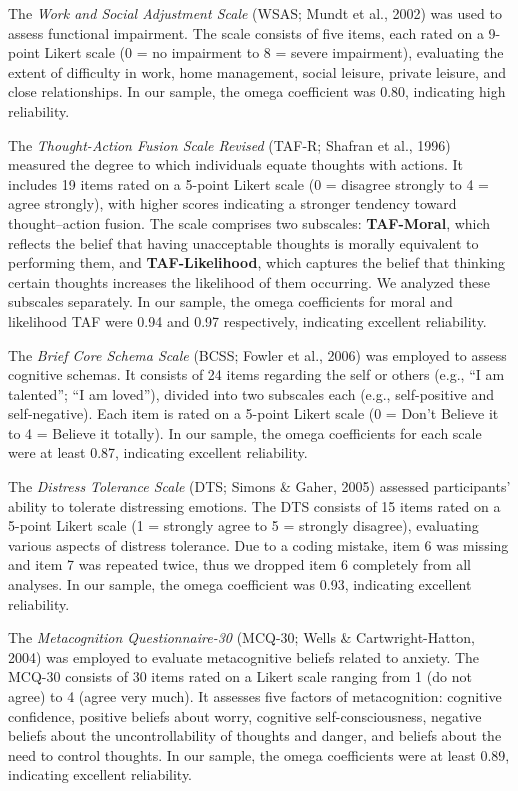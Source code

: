 \documentclass[
  man,floatsintext]{apa7}
\begin{document}
The \emph{Work and Social Adjustment Scale} (WSAS; Mundt et al., 2002) was used to assess functional impairment.
The scale consists of five items, each rated on a 9-point Likert scale (0 = no impairment to 8 = severe impairment), evaluating the extent of difficulty in work, home management, social leisure, private leisure, and close relationships.
In our sample, the omega coefficient was 0.80, indicating high reliability.

The \emph{Thought-Action Fusion Scale Revised} (TAF-R; Shafran et al., 1996) measured the degree to which individuals equate thoughts with actions.
It includes 19 items rated on a 5-point Likert scale (0 = disagree strongly to 4 = agree strongly), with higher scores indicating a stronger tendency toward thought--action fusion.
The scale comprises two subscales: \textbf{TAF-Moral}, which reflects the belief that having unacceptable thoughts is morally equivalent to performing them, and \textbf{TAF-Likelihood}, which captures the belief that thinking certain thoughts increases the likelihood of them occurring.
We analyzed these subscales separately.
In our sample, the omega coefficients for moral and likelihood TAF were 0.94 and 0.97 respectively, indicating excellent reliability.

The \emph{Brief Core Schema Scale} (BCSS; Fowler et al., 2006) was employed to assess cognitive schemas.
It consists of 24 items regarding the self or others (e.g., ``I am talented''; ``I am loved''), divided into two subscales each (e.g., self-positive and self-negative).
Each item is rated on a 5-point Likert scale (0 = Don't Believe it to 4 = Believe it totally).
In our sample, the omega coefficients for each scale were at least 0.87, indicating excellent reliability.

The \emph{Distress Tolerance Scale} (DTS; Simons \& Gaher, 2005) assessed participants' ability to tolerate distressing emotions.
The DTS consists of 15 items rated on a 5-point Likert scale (1 = strongly agree to 5 = strongly disagree), evaluating various aspects of distress tolerance.
Due to a coding mistake, item 6 was missing and item 7 was repeated twice, thus we dropped item 6 completely from all analyses.
In our sample, the omega coefficient was 0.93, indicating excellent reliability.

The \emph{Metacognition Questionnaire-30} (MCQ-30; Wells \& Cartwright-Hatton, 2004) was employed to evaluate metacognitive beliefs related to anxiety.
The MCQ-30 consists of 30 items rated on a Likert scale ranging from 1 (do not agree) to 4 (agree very much).
It assesses five factors of metacognition: cognitive confidence, positive beliefs about worry, cognitive self-consciousness, negative beliefs about the uncontrollability of thoughts and danger, and beliefs about the need to control thoughts.
In our sample, the omega coefficients were at least 0.89, indicating excellent reliability.
\end{document}
